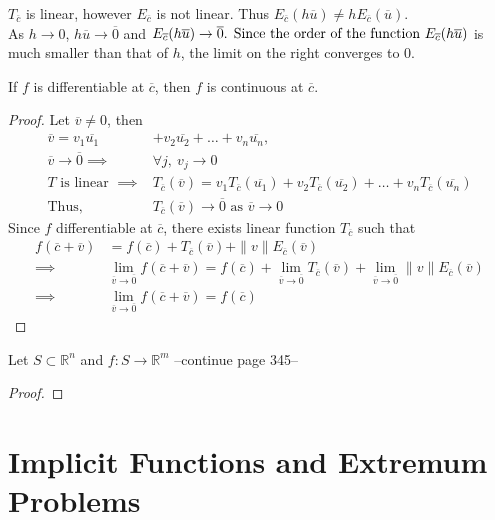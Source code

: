 \begin{note}
	$T_{\overline{c}}$ is linear, however $E_{\overline{c}}$ is not linear. Thus $E_{\overline{c}}(h\overline{u}) \ne h E_{\overline{c}} (\overline{u})$.\\

	As $h \to 0$, $h\overline{u} \to \overline{0}$ and \( E_{\overline{c}}(h\overline{u}) \to \overline{0}$. Since the order of the function \( E_{\overline{c}}(h\overline{u}) \) is much smaller than that of $h$, the limit on the right converges to 0.
\end{note}

\begin{theorem}
	If $f$ is differentiable at \( \overline{c} \), then $f$ is continuous at \( \overline{c} \).
\end{theorem}
\begin{proof}
	Let $\overline{v} \ne 0$, then
	\begin{align*}
		\overline{v} = v_1 \overline{u_1} & + v_2 \overline{u_2} + \dots + v_n \overline{u_n},\\
		\overline{v} \to \overline{0} \implies & \forall j,\ v_j \to 0 \\
		T \text{ is linear }\implies & T_{\overline{c}} (\overline{v}) = v_1 T_{\overline{c}}(\overline{u_1}) + v_2 T_{\overline{c}}(\overline{u_2}) + \dots + v_n T_{\overline{c}}(\overline{u_n})\\
		\text{Thus, } & T_{\overline{c}}(\overline{v}) \to \overline{0} \text{ as } \overline{v} \to 0
	\end{align*}
	Since $f$ differentiable at \( \overline{c} \), there exists linear function $T_{\overline{c}}$ such that
	\begin{align*}
		f(\overline{c}+\overline{v}) & =  f(\overline{c}) + T_{\overline{c}}(\overline{v}) + \|v\|E_{\overline{c}}(\overline{v}) \\
		\implies & \lim_{\overline{v} \to \overline{0}} f(\overline{c}+\overline{v}) = f(\overline{c}) + \lim_{\overline{v} \to \overline{0}} T_{\overline{c}}(\overline{v}) + \lim_{\overline{v} \to \overline{0}} \|v\|E_{\overline{c}}(\overline{v})\\
		\implies & \lim_{\overline{v} \to \overline{0}} f(\overline{c}+\overline{v}) = f(\overline{c})
	\end{align*}
\end{proof}

\begin{theorem}
	Let $S \subset \mathbb{R}^n$ and $f : S \to \mathbb{R}^m$ --continue page 345--
\end{theorem}
\begin{proof}
\end{proof}
\chapter{Implicit Functions and Extremum Problems}

